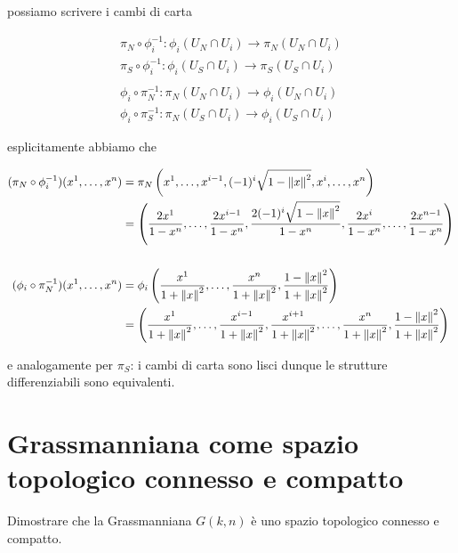 possiamo scrivere i cambi di carta

\begin{gather}
	\pi_{N} \circ \phi_{i}^{-1} : \phi_{i}(U_{N} \cap U_{i}) \to \pi_{N}(U_{N} \cap U_{i})\\
	\pi_{S} \circ \phi_{i}^{-1} : \phi_{i}(U_{S} \cap U_{i}) \to \pi_{S}(U_{S} \cap U_{i})\\
	\nonumber\\
	\phi_{i} \circ \pi_{N}^{-1} : \pi_{N}(U_{N} \cap U_{i}) \to \phi_{i}(U_{N} \cap U_{i})\\
	\phi_{i} \circ \pi_{S}^{-1} : \pi_{N}(U_{S} \cap U_{i}) \to \phi_{i}(U_{S} \cap U_{i})
\end{gather}

esplicitamente abbiamo che

\begin{align}
	\begin{split}
		(\pi_{N} \circ \phi_{i}^{-1})(x^{1},\dots,x^{n}) &= \pi_{N} \left( x^{1}, \dots, x^{i-1}, (-1)^{i} \sqrt{1 - \norm{x}^{2}}, x^{i}, \dots, x^{n} \right)\\
		&= \left( \dfrac{2 x^{1}}{1-x^{n}}, \dots, \dfrac{2 x^{i-1}}{1-x^{n}}, \dfrac{2 (-1)^{i} \sqrt{1 - \norm{x}^{2}}}{1-x^{n}}, \dfrac{2 x^{i}}{1-x^{n}}, \dots, \dfrac{2 x^{n-1}}{1-x^{n}} \right)\\\\
		(\phi_{i} \circ \pi_{N}^{-1})(x^{1},\dots,x^{n}) &= \phi_{i} \left( \dfrac{x^{1}}{1 + \norm{x}^{2}}, \dots, \dfrac{x^{n}}{1 + \norm{x}^{2}}, \dfrac{1 - \norm{x}^{2}}{1 + \norm{x}^{2}} \right)\\
		&= \left( \dfrac{x^{1}}{1 + \norm{x}^{2}}, \dots, \dfrac{x^{i-1}}{1 + \norm{x}^{2}}, \dfrac{x^{i+1}}{1 + \norm{x}^{2}}, \dots, \dfrac{x^{n}}{1 + \norm{x}^{2}}, \dfrac{1 - \norm{x}^{2}}{1 + \norm{x}^{2}} \right)
	\end{split}
\end{align}

e analogamente per $ \pi_{S} $: i cambi di carta sono lisci dunque le strutture differenziabili sono equivalenti.

%

\newpage

%

\section{Grassmanniana come spazio topologico connesso e compatto}\label{es2-5}

\begin{tcolorbox}
	Dimostrare che la Grassmanniana $ G(k,n) $ è uno spazio topologico connesso e compatto.
\end{tcolorbox}

